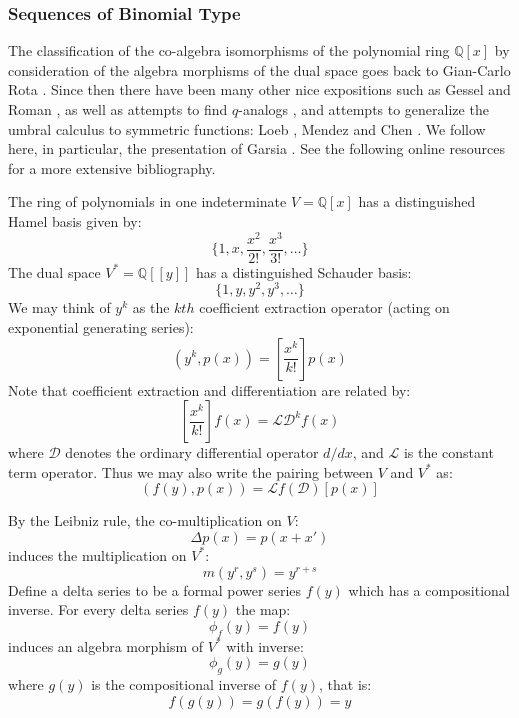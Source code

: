 \documentclass[12pt,dvips]{amsart}
\begin{document}

\subsubsection{Sequences of Binomial Type}\label{bintype}
The classification of the co-algebra isomorphisms of the polynomial ring $\mathbb{Q}[x]$ by consideration of the algebra morphisms of the dual space goes back to Gian-Carlo Rota \cite{ROTA,FINOP}. Since then there have been many other nice expositions such as Gessel \cite{GESSUMB} and Roman \cite{ROMAN}, as well as attempts to find $q$-analogs \cite{ANDREWS, QUMBRAL, QROMAN}, and attempts to generalize the umbral calculus to symmetric functions: Loeb \cite{LOEB}, Mendez \cite{COMBSYM1, MENDEZ} and Chen \cite{CHEN2, CHEN1}.  We follow here, in particular, the presentation of Garsia \cite{EXPOSE, UMBLAG, COMPSEQ}. See the following online resources \cite{UMBSURV1, UMBSURV2} for a more extensive bibliography.

The ring of polynomials in one indeterminate $V = \mathbb{Q}[x]$ has a distinguished Hamel basis given by:
$$\{1,x,\frac{x^2}{2!},\frac{x^3}{3!}, \ldots \}$$ 
The dual space $V^* = \mathbb{Q}[[y]]$ has a distinguished Schauder basis:
$$\{1,y,y^2,y^3, \ldots \}$$
We may think of $y^k$ as the $kth$ coefficient extraction operator (acting on exponential generating series):
$$ (y^k, p(x) ) = \left [ \frac{x^k}{k!} \right ] p(x) $$
Note that coefficient extraction and differentiation are related by:
$$ \left [ \frac{x^k}{k!} \right ]f(x) = \mathcal{LD}^k f(x) $$
where $\mathcal{D}$ denotes the ordinary differential operator $d/dx$, and $\mathcal{L}$ is the constant term operator. Thus we may also write the pairing between $V$ and $V^*$ as:
$$ (f(y), p(x) ) = \mathcal{L}f(\mathcal{D})[p(x)] $$

\noindent
By the Leibniz rule, the co-multiplication on $V$:
$$ \Delta p(x) = p(x + x') $$
induces the multiplication on $V^*$:
$$m(y^r,y^s) = y^{r+s}$$
Define a delta series to be a formal power series $f(y)$ which has a compositional inverse. For every delta series $f(y)$ the map:
$$ \phi_f(y) = f(y) $$ 
induces an algebra morphism of $V^*$ with inverse:
$$ \phi_g(y) = g(y) $$
where $g(y)$ is the compositional inverse of $f(y)$, that is: 
$$f(g(y)) = g(f(y)) = y$$ 
\end{document}
